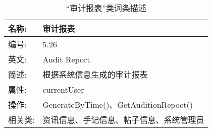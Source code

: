\begin{table}[H]  
\caption{“审计报表”类词条描述}  
\begin{center}  
    \begin{tabular}{l p{11cm}} 
        \hline
        \quad 名称:  & 审计报表 \\
        \hline
        \quad 编号:  & 5.26 \\
        \hline
        \quad 英文:  &  Audit Report\\
        \hline
        \quad 简述:  & 根据系统信息生成的审计报表 \\
        \hline
        \quad 属性:  & currentUser \\
        \hline
        \quad 操作:  & GenerateByTime()、GetAuditionRepoet()\\
        \hline
        \quad 相关类: & 资讯信息、手记信息、帖子信息、系统管理员\\
        \hline
    \end{tabular}
\end{center}
\end{table}